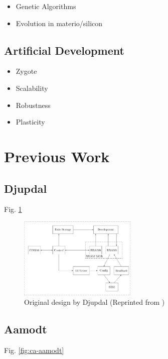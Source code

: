 \documentclass[a4paper]{IEEEtran}
\begin{document}
\begin{itemize}
    \item Genetic Algorithms
    \item Evolution in materio/silicon \cite{miller2014evolution}
\end{itemize}

\subsection{Artificial Development \cite{harding2008artificial}\cite{tufte2008evodevo}}
\begin{itemize}
    \item Zygote
    \item Scalability
    \item Robustness
    \item Plasticity
\end{itemize}

\section{Previous Work}

\subsection{Djupdal \cite{djupdal2003sblock}}

Fig. \ref{fig:ca-djupdal}

\begin{figure}[h!]
    \centering
    \includegraphics[width=0.5\textwidth]{figures/ca-djupdal}
    \caption{Original design by Djupdal (Reprinted from \cite{stovneng2014sblock})}
    \label{fig:ca-djupdal}
\end{figure}

\subsection{Aamodt \cite{aamodt2005sblock}}

Fig. \ref{fig:ca-aamodt}
\end{document}
